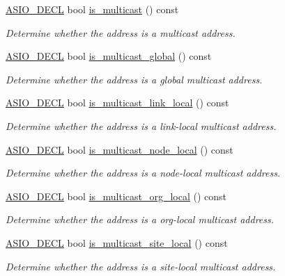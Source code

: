 \begin{DoxyCompactItemize}
\hyperlink{config_8hpp_ab54d01ea04afeb9a8b39cfac467656b7}{A\+S\+I\+O\+\_\+\+D\+E\+C\+L} bool \hyperlink{classasio_1_1ip_1_1address__v6_ab81065a9f7db47136efbb0f3cb65de7c}{is\+\_\+multicast} () const 
\begin{DoxyCompactList}\small\item\em Determine whether the address is a multicast address. \end{DoxyCompactList}\item 
\hyperlink{config_8hpp_ab54d01ea04afeb9a8b39cfac467656b7}{A\+S\+I\+O\+\_\+\+D\+E\+C\+L} bool \hyperlink{classasio_1_1ip_1_1address__v6_ad84b79a007ca9445aad74bc1b3ca734c}{is\+\_\+multicast\+\_\+global} () const 
\begin{DoxyCompactList}\small\item\em Determine whether the address is a global multicast address. \end{DoxyCompactList}\item 
\hyperlink{config_8hpp_ab54d01ea04afeb9a8b39cfac467656b7}{A\+S\+I\+O\+\_\+\+D\+E\+C\+L} bool \hyperlink{classasio_1_1ip_1_1address__v6_aaaddcfa9dbcbcdc88ddd2980d7716f56}{is\+\_\+multicast\+\_\+link\+\_\+local} () const 
\begin{DoxyCompactList}\small\item\em Determine whether the address is a link-\/local multicast address. \end{DoxyCompactList}\item 
\hyperlink{config_8hpp_ab54d01ea04afeb9a8b39cfac467656b7}{A\+S\+I\+O\+\_\+\+D\+E\+C\+L} bool \hyperlink{classasio_1_1ip_1_1address__v6_a1c431315ca91554d3b2c154db1cbf472}{is\+\_\+multicast\+\_\+node\+\_\+local} () const 
\begin{DoxyCompactList}\small\item\em Determine whether the address is a node-\/local multicast address. \end{DoxyCompactList}\item 
\hyperlink{config_8hpp_ab54d01ea04afeb9a8b39cfac467656b7}{A\+S\+I\+O\+\_\+\+D\+E\+C\+L} bool \hyperlink{classasio_1_1ip_1_1address__v6_a00f0ca605a7481ebb2614a2ef86e7c27}{is\+\_\+multicast\+\_\+org\+\_\+local} () const 
\begin{DoxyCompactList}\small\item\em Determine whether the address is a org-\/local multicast address. \end{DoxyCompactList}\item 
\hyperlink{config_8hpp_ab54d01ea04afeb9a8b39cfac467656b7}{A\+S\+I\+O\+\_\+\+D\+E\+C\+L} bool \hyperlink{classasio_1_1ip_1_1address__v6_a276460ff1de2ce87931dade528876c8c}{is\+\_\+multicast\+\_\+site\+\_\+local} () const 
\begin{DoxyCompactList}\small\item\em Determine whether the address is a site-\/local multicast address. \end{DoxyCompactList}\end{DoxyCompactItemize}
